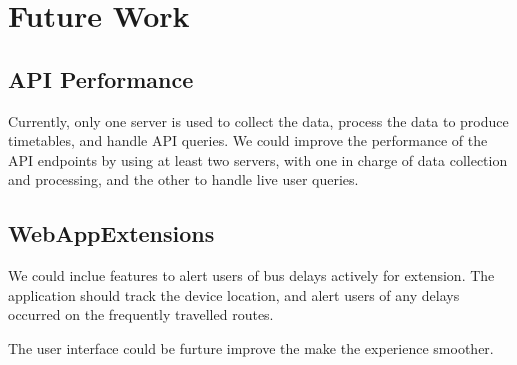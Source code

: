 \chapter{Future Work}

\section{API Performance}
\par Currently, only one server is used to collect the data, process the data to produce timetables, and handle API queries. We could improve the performance of the API endpoints by using at least two servers, with one in charge of data collection and processing, and the other to handle live user queries.




\section{WebAppExtensions}
\par We could inclue features to alert users of bus delays actively for extension. The application should track the device location, and alert users of any delays occurred on the frequently travelled routes.

\par The user interface could be furture improve the make the experience smoother.
